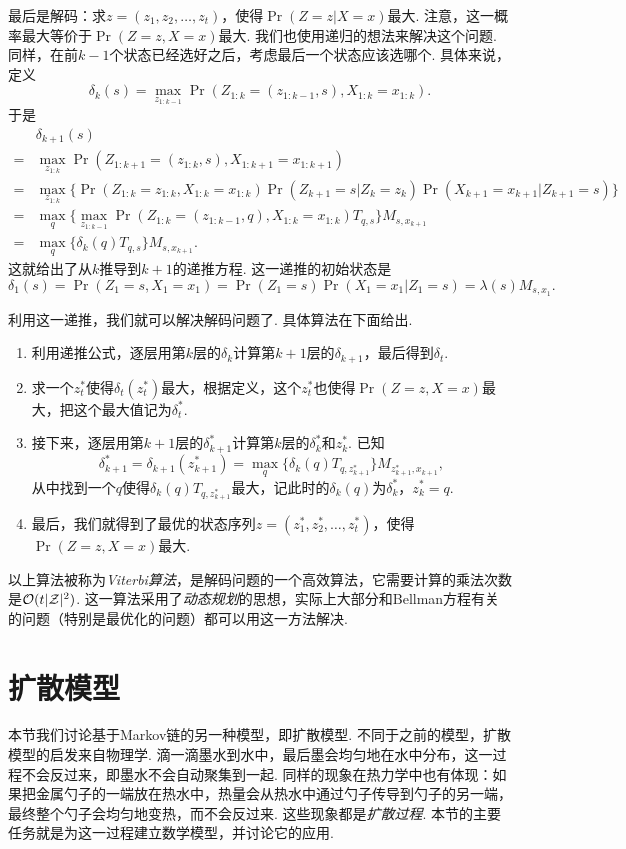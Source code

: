 最后是解码：求$z=(z_1,z_2,\dots,z_t)$，使得$\Pr(Z=z|X=x)$最大. 注意，这一概率最大等价于$\Pr(Z=z,X=x)$最大. 我们也使用递归的想法来解决这个问题. 同样，在前$k-1$个状态已经选好之后，考虑最后一个状态应该选哪个. 具体来说，定义
    \[\delta_k(s) = \max_{z_{1:k-1}}\Pr(Z_{1:k} = (z_{1:k-1}, s), X_{1:k}=x_{1:k}).\]
于是
\begin{align*}
    &\delta_{k+1}(s) \\
    =& \max_{z_{1:k}}\Pr(Z_{1:k+1} = (z_{1:k}, s), X_{1:k+1}=x_{1:k+1})\\
    =& \max_{z_{1:k}}\{\Pr(Z_{1:k} = z_{1:k}, X_{1:k}=x_{1:k})\Pr(Z_{k+1}=s|Z_k=z_k) \Pr(X_{k+1}=x_{k+1}|Z_{k+1}=s)\}\\
    =& \max_{q}\{\max_{z_{1:k-1}}\Pr(Z_{1:k} = (z_{1:k-1},q), X_{1:k}=x_{1:k})T_{q,s}\}M_{s,x_{k+1}}\\
    =& \max_{q}\{\delta_k(q)T_{q,s}\}M_{s,x_{k+1}}.
\end{align*}
这就给出了从$k$推导到$k+1$的递推方程. 这一递推的初始状态是
\[\delta_1(s) = \Pr(Z_1=s, X_1=x_1) = \Pr(Z_1=s)\Pr(X_1=x_1|Z_1=s) = \lambda(s)M_{s,x_1}.\]

利用这一递推，我们就可以解决解码问题了. 具体算法在下面给出.
\begin{enumerate}
    \item 利用递推公式，逐层用第$k$层的$\delta_k$计算第$k+1$层的$\delta_{k+1}$，最后得到$\delta_t$. 
    \item 求一个$z_t^*$使得$\delta_t(z_t^*)$最大，根据定义，这个$z_t^*$也使得$\Pr(Z=z,X=x)$最大，把这个最大值记为$\delta^*_t$.
    \item 接下来，逐层用第$k+1$层的$\delta_{k+1}^*$计算第$k$层的$\delta_k^*$和$z_k^*$. 已知
    \[\delta_{k+1}^*=\delta_{k+1}(z_{k+1}^*)=\max_{q}\{\delta_k(q)T_{q,z_{k+1}^*}\}M_{z_{k+1}^*,x_{k+1}},\]
    从中找到一个$q$使得$\delta_k(q)T_{q,z_{k+1}^*}$最大，记此时的$\delta_k(q)$为$\delta_k^*$，$z_k^*=q$.
    \item 最后，我们就得到了最优的状态序列$z=(z_1^*,z_2^*,\dots,z_t^*)$，使得$\Pr(Z=z,X=x)$最大.
\end{enumerate}
以上算法被称为\emph{Viterbi算法}，是解码问题的一个高效算法，它需要计算的乘法次数是$\mathcal{O}(t|\mathcal Z|^2)$. 这一算法采用了\emph{动态规划}的思想，实际上大部分和Bellman方程有关的问题（特别是最优化的问题）都可以用这一方法解决.

\section{扩散模型}

本节我们讨论基于Markov链的另一种模型，即扩散模型. 不同于之前的模型，扩散模型的启发来自物理学. 滴一滴墨水到水中，最后墨会均匀地在水中分布，这一过程不会反过来，即墨水不会自动聚集到一起. 同样的现象在热力学中也有体现：如果把金属勺子的一端放在热水中，热量会从热水中通过勺子传导到勺子的另一端，最终整个勺子会均匀地变热，而不会反过来. 这些现象都是\emph{扩散过程}. 本节的主要任务就是为这一过程建立数学模型，并讨论它的应用. 

